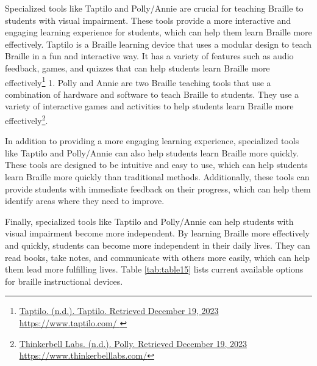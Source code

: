\documentclass[12pt,letterpaper,twoside,openright]{report}
\begin{document}
Specialized tools like Taptilo and Polly/Annie are crucial for teaching Braille to students with visual impairment. These tools provide a more interactive and engaging learning experience for students, which can help them learn Braille more effectively. Taptilo is a Braille learning device that uses a modular design to teach Braille in a fun and interactive way. It has a variety of features such as audio feedback, games, and quizzes that can help students learn Braille more effectively\footnote{\raggedright \href{https://www.taptilo.com/ }{Taptilo. (n.d.). Taptilo. Retrieved December 19, 2023} \url{https://www.taptilo.com/ }} 1. Polly and Annie are two Braille teaching tools that use a combination of hardware and software to teach Braille to students. They use a variety of interactive games and activities to help students learn Braille more effectively\footnote{\raggedright \href{https://www.thinkerbelllabs.com/}{Thinkerbell Labs. (n.d.). Polly. Retrieved December 19, 2023} \url{https://www.thinkerbelllabs.com/}}.

In addition to providing a more engaging learning experience, specialized tools like Taptilo and Polly/Annie can also help students learn Braille more quickly. These tools are designed to be intuitive and easy to use, which can help students learn Braille more quickly than traditional methods. Additionally, these tools can provide students with immediate feedback on their progress, which can help them identify areas where they need to improve.

Finally, specialized tools like Taptilo and Polly/Annie can help students with visual impairment become more independent. By learning Braille more effectively and quickly, students can become more independent in their daily lives. They can read books, take notes, and communicate with others more easily, which can help them lead more fulfilling lives.
Table \ref{tab:table15} lists current available options for braille instructional devices.
\end{document}

